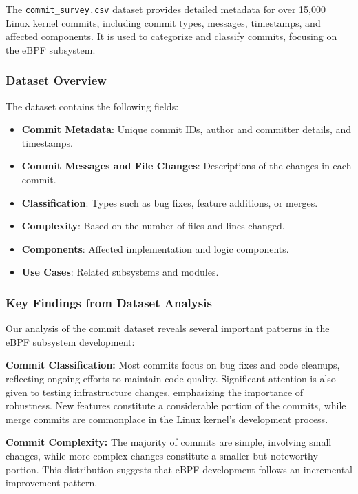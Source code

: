 The \texttt{commit\_survey.csv} dataset provides detailed metadata for over 15,000 Linux kernel commits, including commit types, messages, timestamps, and affected components. It is used to categorize and classify commits, focusing on the eBPF subsystem.

\subsubsection{Dataset Overview}

The dataset contains the following fields:

\begin{itemize}
    \item \textbf{Commit Metadata}: Unique commit IDs, author and committer details, and timestamps.
    \item \textbf{Commit Messages and File Changes}: Descriptions of the changes in each commit.
    \item \textbf{Classification}: Types such as bug fixes, feature additions, or merges.
    \item \textbf{Complexity}: Based on the number of files and lines changed.
    \item \textbf{Components}: Affected implementation and logic components.
    \item \textbf{Use Cases}: Related subsystems and modules.
\end{itemize}

\subsubsection{Key Findings from Dataset Analysis}

Our analysis of the commit dataset reveals several important patterns in the eBPF subsystem development:

\textbf{Commit Classification:} Most commits focus on bug fixes and code cleanups, reflecting ongoing efforts to maintain code quality. Significant attention is also given to testing infrastructure changes, emphasizing the importance of robustness. New features constitute a considerable portion of the commits, while merge commits are commonplace in the Linux kernel's development process.

\textbf{Commit Complexity:} The majority of commits are simple, involving small changes, while more complex changes constitute a smaller but noteworthy portion. This distribution suggests that eBPF development follows an incremental improvement pattern.

